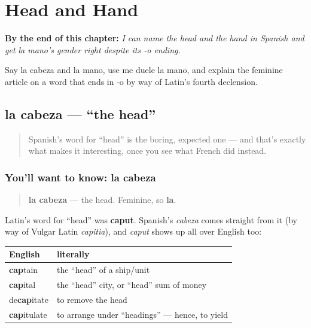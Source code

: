 
\chapter{Head and Hand}
\label{ch:spanish-head-and-hand}

\begin{chapteropening}
\textbf{By the end of this chapter:} \emph{I can name the head and the hand in Spanish and get la mano's gender right despite its -o ending.}

Say la cabeza and la mano, use me duele la mano, and explain the feminine article on a word that ends in -o by way of Latin's fourth declension.
\end{chapteropening}

\section[la cabeza]{la cabeza — \textquotedblleft{}the head\textquotedblright{}}

\label{lesson:ES-C24-cabeza}



\begin{quote}
Spanish's word for \textquotedblleft{}head\textquotedblright{} is the boring, expected one — and that's exactly what makes it interesting, once you see what French did instead.
\end{quote}

\subsection*{You'll want to know: la cabeza}
\begin{quote}
\textbf{la cabeza} — the head. Feminine, so \textbf{la}.
\end{quote}

\begin{cousinweb}
Latin's word for \textquotedblleft{}head\textquotedblright{} was \textbf{caput}. Spanish's \emph{cabeza} comes straight from it (by way of Vulgar Latin \emph{capitia}), and \emph{caput} shows up all over English too:

\noindent
\begin{tabularx}{\linewidth}{@{}>{\raggedright\arraybackslash}X>{\raggedright\arraybackslash}X@{}}
\toprule
\textbf{English} & \textbf{literally} \\
\midrule
\textbf{cap}tain & the \textquotedblleft{}head\textquotedblright{} of a ship/unit \\
\textbf{cap}ital & the \textquotedblleft{}head\textquotedblright{} city, or \textquotedblleft{}head\textquotedblright{} sum of money \\
de\textbf{cap}itate & to remove the head \\
\textbf{cap}itulate & to arrange under \textquotedblleft{}headings\textquotedblright{} — hence, to yield \\
\bottomrule
\end{tabularx}
\end{cousinweb}

